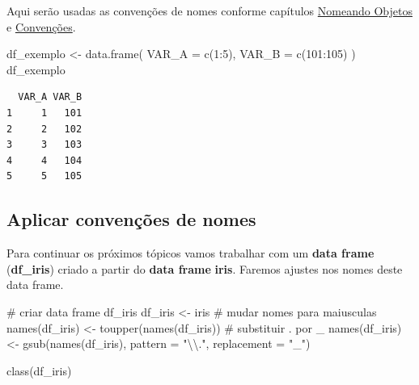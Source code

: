 \documentclass[
  letterpaper,
  DIV=11,
  numbers=noendperiod]{scrreprt}
\newenvironment{Shaded}{\begin{snugshade}}{\end{snugshade}}
\newcommand{\AttributeTok}[1]{\textcolor[rgb]{0.40,0.45,0.13}{#1}}
\newcommand{\CommentTok}[1]{\textcolor[rgb]{0.37,0.37,0.37}{#1}}
\newcommand{\DecValTok}[1]{\textcolor[rgb]{0.68,0.00,0.00}{#1}}
\newcommand{\FunctionTok}[1]{\textcolor[rgb]{0.28,0.35,0.67}{#1}}
\newcommand{\NormalTok}[1]{\textcolor[rgb]{0.00,0.23,0.31}{#1}}
\newcommand{\OtherTok}[1]{\textcolor[rgb]{0.00,0.23,0.31}{#1}}
\newcommand{\SpecialCharTok}[1]{\textcolor[rgb]{0.37,0.37,0.37}{#1}}
\newcommand{\StringTok}[1]{\textcolor[rgb]{0.13,0.47,0.30}{#1}}
\begin{document}
Aqui serão usadas as convenções de nomes conforme capítulos
\href{nomes.html}{Nomeando Objetos} e
\href{convencoes.html}{Convenções}.

\begin{Shaded}
\begin{Highlighting}[]
\NormalTok{df\_exemplo }\OtherTok{\textless{}{-}} \FunctionTok{data.frame}\NormalTok{(}
  \AttributeTok{VAR\_A =} \FunctionTok{c}\NormalTok{(}\DecValTok{1}\SpecialCharTok{:}\DecValTok{5}\NormalTok{),}
  \AttributeTok{VAR\_B =} \FunctionTok{c}\NormalTok{(}\DecValTok{101}\SpecialCharTok{:}\DecValTok{105}\NormalTok{)}
\NormalTok{)}
\NormalTok{df\_exemplo}
\end{Highlighting}
\end{Shaded}

\begin{verbatim}
  VAR_A VAR_B
1     1   101
2     2   102
3     3   103
4     4   104
5     5   105
\end{verbatim}

\hypertarget{aplicar-convenuxe7uxf5es-de-nomes}{%
\subsection{Aplicar convenções de
nomes}\label{aplicar-convenuxe7uxf5es-de-nomes}}

Para continuar os próximos tópicos vamos trabalhar com um \textbf{data
frame} (\textbf{df\_iris}) criado a partir do \textbf{data frame}
\textbf{iris}. Faremos ajustes nos nomes deste data frame.

\begin{Shaded}
\begin{Highlighting}[]
\CommentTok{\# criar data frame df\_iris}
\NormalTok{df\_iris }\OtherTok{\textless{}{-}}\NormalTok{ iris}
\CommentTok{\# mudar nomes para maiusculas}
\FunctionTok{names}\NormalTok{(df\_iris) }\OtherTok{\textless{}{-}} \FunctionTok{toupper}\NormalTok{(}\FunctionTok{names}\NormalTok{(df\_iris))}
\CommentTok{\# substituir \textquotesingle{}.\textquotesingle{} por \textquotesingle{}\_\textquotesingle{}}
\FunctionTok{names}\NormalTok{(df\_iris) }\OtherTok{\textless{}{-}} \FunctionTok{gsub}\NormalTok{(}\FunctionTok{names}\NormalTok{(df\_iris), }\AttributeTok{pattern =} \StringTok{"}\SpecialCharTok{\textbackslash{}\textbackslash{}}\StringTok{."}\NormalTok{, }\AttributeTok{replacement =} \StringTok{"\_"}\NormalTok{)  }

\FunctionTok{class}\NormalTok{(df\_iris)}
\end{Highlighting}
\end{Shaded}
\end{document}
